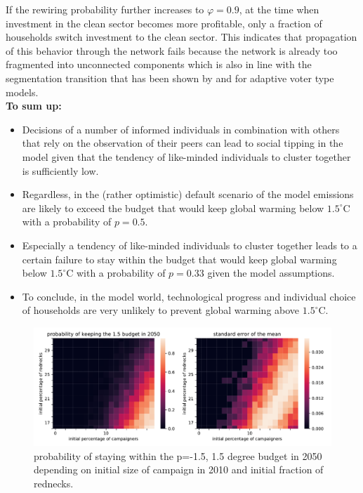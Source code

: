 If the rewiring probability further increases to $\varphi=0.9$, at the time when investment in the clean sector becomes more profitable, only a fraction of households switch investment to the clean sector. This indicates that propagation of this behavior through the network fails because the network is already too fragmented into unconnected components which is also in line with the segmentation transition that has been shown by \cite{Rogers2013, Wiedermann2015, Klamser2016} and \cite{Min2017} for adaptive voter type models.\\

\textbf{To sum up:}
\begin{itemize}
  \item Decisions of a number of informed individuals in combination with others that rely on the observation of their peers can lead to social tipping in the model given that the tendency of like-minded individuals to cluster together is sufficiently low.
  \item Regardless, in the (rather optimistic) default scenario of the model emissions are likely to exceed the budget that would keep global warming below $1.5^{\circ}$C with a probability of $p=0.5$.
  \item Especially a tendency of like-minded individuals to cluster together leads to a certain failure to stay within the budget that would keep global warming below $1.5^{\circ}$C with a probability of $p=0.33$ given the model assumptions.
  \item To conclude, in the model world, technological progress and individual choice of households are very unlikely to prevent global warming above $1.5^{\circ}$C.
\end{itemize}



\begin{figure}[t]
    \centering
\includegraphics[width = \textwidth]{figures/p_budget15p50_in2050.pdf}
    \caption{probability of staying within the p=-1.5, 1.5 degree budget in 2050 depending on initial size of campaign in 2010 and initial fraction of rednecks.}
    \label{fig:p15in2050}
\end{figure}

